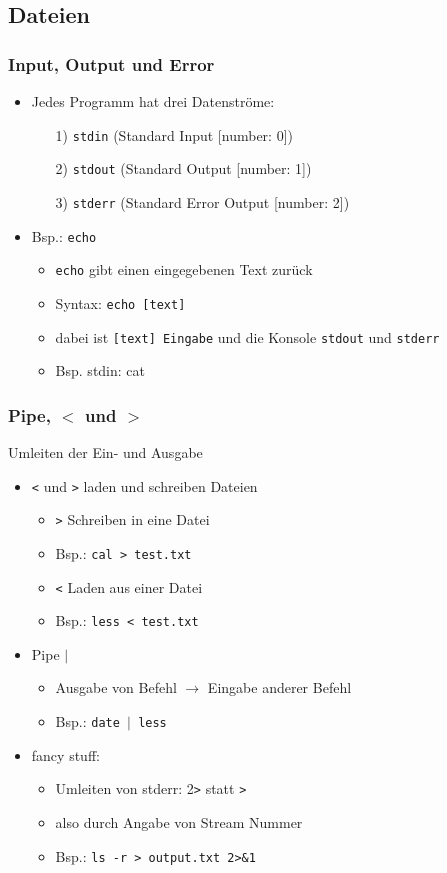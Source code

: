 \documentclass[12pt,utf8, handout]{beamer}
\begin{document}
\subsection{Dateien}
\begin{frame}
\frametitle{Input, Output und Error}
\begin{itemize}
	\item Jedes Programm hat drei Datenströme:
	\begin{itemize}
		\item[1)] \texttt{stdin} (Standard Input [number: 0])
		\item[2)] \texttt{stdout} (Standard Output [number: 1])
		\item[3)] \texttt{stderr} (Standard Error Output [number: 2])
	\end{itemize}
	\item Bsp.: \texttt{echo}
	\begin{itemize}[<+->]
		\item \texttt{echo} gibt einen eingegebenen Text zurück
		\item Syntax: \texttt{echo [text]}
		\item dabei ist \texttt{[text] Eingabe} und die Konsole \texttt{stdout} und \texttt{stderr}
		\item Bsp. stdin: cat
	\end{itemize}
\end{itemize}
\end{frame}


\begin{frame}
\frametitle{Pipe, $<$ und $>$ }
Umleiten der Ein- und Ausgabe
\begin{itemize}[<+->]
	\item \texttt{<} und \texttt{>} laden und schreiben Dateien
	\begin{itemize}[<+->]
		\item \texttt{>} Schreiben in eine Datei
		\item Bsp.: \texttt{cal > test.txt}
		\item \texttt{<} Laden aus einer Datei
		\item Bsp.: \texttt{less < test.txt}
	\end{itemize}
	\item Pipe \texttt{$\mid$}
	\begin{itemize}[<+->]
		\item Ausgabe von Befehl $\to$ Eingabe anderer Befehl
		\item Bsp.: \texttt{date $\mid$ less}
	\end{itemize}
	\item fancy stuff:
	\begin{itemize}[<+->]
		\item Umleiten von stderr: 2\texttt{>} statt \texttt{>}
		\item also durch Angabe von Stream Nummer
		\item Bsp.: \texttt{ls -r > output.txt 2>\&1 }
	\end{itemize}
\end{itemize}
\end{frame}
\end{document}
